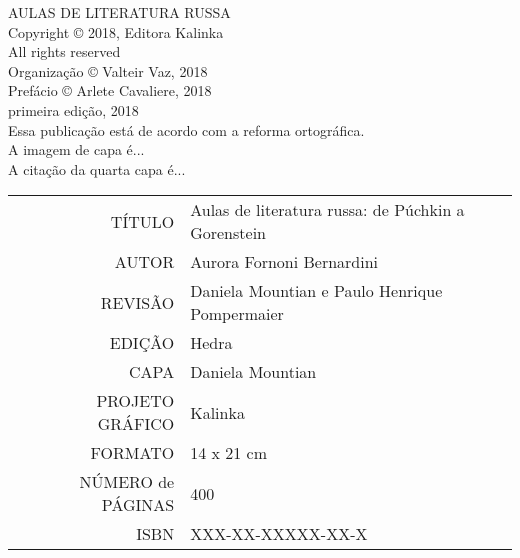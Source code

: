 

\newpage
\pagestyle{empty}

\footnotesize
\begin{center}
AULAS DE LITERATURA RUSSA\\[6pt]

Copyright © 2018, Editora Kalinka\\[6pt]

All rights reserved\\[20pt]

Organização © Valteir Vaz, 2018\\[6pt]

Prefácio © Arlete Cavaliere, 2018\\[6pt]

primeira edição, 2018\\[40pt]


Essa publicação está de acordo com a reforma ortográfica.\\[6pt]
A imagem de capa é...\\[6pt]	
A citação da quarta capa é...\\[20pt] 
\end{center}

\bigskip

\begin{vplace}[1]
\begin{table}[ht!]
\footnotesize
\begin{tabular}{rl}
TÍTULO            & Aulas de literatura russa: de Púchkin a Gorenstein \\[2pt]
AUTOR             & Aurora Fornoni Bernardini                          \\[2pt]
REVISÃO           & Daniela Mountian e Paulo Henrique Pompermaier      \\[2pt]
EDIÇÃO            & Hedra                                              \\[2pt]
CAPA              & Daniela Mountian                                   \\[2pt]
PROJETO GRÁFICO   & Kalinka                                            \\[2pt]
FORMATO           & 14 x 21 cm                                         \\[2pt]
NÚMERO de PÁGINAS & 400                                                \\[2pt]
ISBN              & XXX-XX-XXXXX-XX-X                                 
\end{tabular}
\end{table}
\end{vplace}

